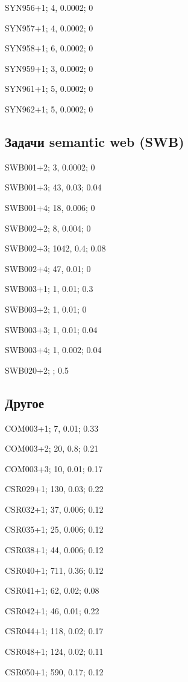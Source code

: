 SYN956+1; 4, 0.0002; 0

SYN957+1; 4, 0.0002; 0

SYN958+1; 6, 0.0002; 0

SYN959+1; 3, 0.0002; 0

SYN961+1; 5, 0.0002; 0

SYN962+1; 5, 0.0002; 0

\subsection*{Задачи semantic web (SWB)}

SWB001+2; 3, 0.0002; 0

SWB001+3; 43, 0.03; 0.04

SWB001+4; 18, 0.006; 0

SWB002+2; 8, 0.004; 0

SWB002+3; 1042, 0.4; 0.08

SWB002+4; 47, 0.01; 0

SWB003+1; 1, 0.01; 0.3

SWB003+2; 1, 0.01; 0

SWB003+3; 1, 0.01; 0.04

SWB003+4; 1, 0.002; 0.04

SWB020+2;	; 0.5


\subsection{Другое}

COM003+1; 7, 0.01; 0.33

COM003+2; 20, 0.8; 0.21

COM003+3; 10, 0.01; 0.17





CSR029+1; 130, 0.03; 0.22

CSR032+1; 37, 0.006; 0.12

CSR035+1; 25, 0.006; 0.12

CSR038+1; 44, 0.006; 0.12

CSR040+1; 711, 0.36; 0.12

CSR041+1; 62, 0.02; 0.08

CSR042+1; 46, 0.01; 0.22

CSR044+1; 118, 0.02; 0.17

CSR048+1; 124, 0.02; 0.11

CSR050+1; 590, 0.17; 0.12

